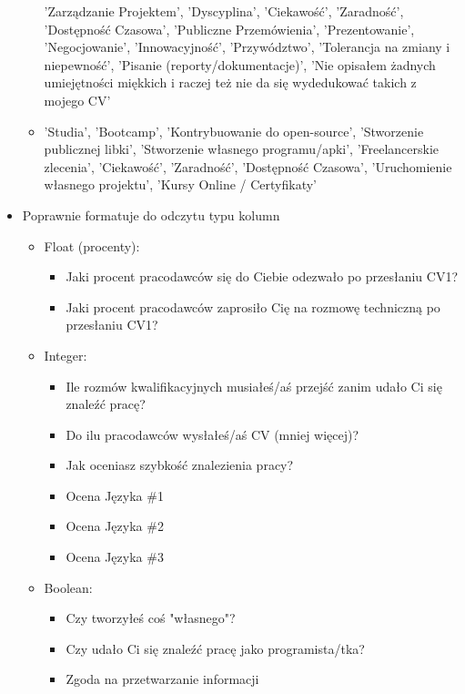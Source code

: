 \documentclass[graybox]{svmult}
\begin{document}
\begin{itemize}
\begin{itemize}
          'Zarządzanie Projektem', 'Dyscyplina', 'Ciekawość', 'Zaradność', 'Dostępność Czasowa',
          'Publiczne Przemówienia', 'Prezentowanie', 'Negocjowanie', 'Innowacyjność',
          'Przywództwo', 'Tolerancja na zmiany i niepewność', 'Pisanie (reporty/dokumentacje)',
          'Nie opisałem żadnych umiejętności miękkich i raczej też nie da się wydedukować takich z mojego CV'
    \item 'Studia', 'Bootcamp', 'Kontrybuowanie do open-source', 'Stworzenie publicznej libki',
          'Stworzenie własnego programu/apki', 'Freelancerskie zlecenia', 'Ciekawość', 'Zaradność', 'Dostępność Czasowa', 'Uruchomienie własnego projektu', 'Kursy Online / Certyfikaty'
  \end{itemize}

  \item Poprawnie formatuje do odczytu typu kolumn
  \begin{itemize}
    \item Float (procenty):
    \begin{itemize}
      \item Jaki procent pracodawców się do Ciebie odezwało po przesłaniu CV1?
      \item Jaki procent pracodawców zaprosiło Cię na rozmowę techniczną po przesłaniu CV1?
    \end{itemize}
    \item Integer:
    \begin{itemize}
      \item Ile rozmów kwalifikacyjnych musiałeś/aś przejść zanim udało Ci się znaleźć pracę?
      \item Do ilu pracodawców wysłałeś/aś CV (mniej więcej)?
      \item Jak oceniasz szybkość znalezienia pracy?
      \item Ocena Języka \#1
      \item Ocena Języka \#2
      \item Ocena Języka \#3
    \end{itemize}
    \item Boolean:
    \begin{itemize}
      \item Czy tworzyłeś coś "własnego"?
      \item Czy udało Ci się znaleźć pracę jako programista/tka?
      \item Zgoda na przetwarzanie informacji
    \end{itemize}
  \end{itemize}
\end{itemize}
\end{document}
